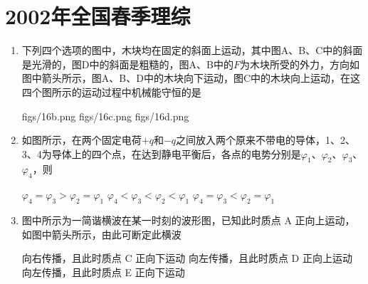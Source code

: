 \documentclass[\gkver]{gaokaozhenti}
\begin{document}
\chapter{2002年全国春季理综}

\begin{enumerate}
\item
下列四个选项的图中，木块均在固定的斜面上运动，其中图A、B、C中的斜面是光滑的，图D中的斜面是粗糙的，图A、B中的$F$为木块所受的外力，方向如图中箭头所示，图A、B、D中的木块向下运动，图C中的木块向上运动，在这四个图所示的运动过程中机械能守恒的是

{figs/16b.png}
{figs/16c.png}
{figs/16d.png}

\item
如图所示，在两个固定电荷$+q$和$-q$之间放入两个原来不带电的导体，1、2、3、4为导体上的四个点，在达到静电平衡后，各点的电势分别是$\varphi_{1}$、$\varphi_{2}$、$\varphi_{3}$、$\varphi_{4}$，则


{$\varphi_{4}=\varphi_{3}>\varphi_{2}=\varphi_{1}$}
{$\varphi_{4}<\varphi_{3}<\varphi_{2}<\varphi_{1}$}
{$\varphi_{4}=\varphi_{3}<\varphi_{2}=\varphi_{1}$}

\item
图中所示为一简谐横波在某一时刻的波形图，已知此时质点 A 正向上运动，如图中箭头所示，由此可断定此横波


{向右传播，且此时质点 C 正向下运动}
{向左传播，且此时质点 D 正向上运动}
{向左传播，且此时质点 E 正向下运动}


\end{enumerate}
\end{document}
